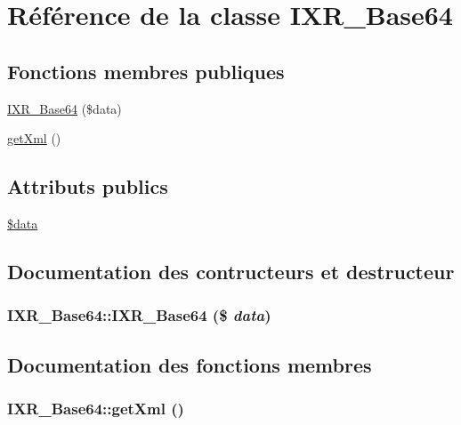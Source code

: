 \hypertarget{classIXR__Base64}{
\section{R\'{e}f\'{e}rence de la classe IXR\_\-Base64}
\label{classIXR__Base64}
}
\subsection*{Fonctions membres publiques}
\begin{CompactItemize}
\item 
\hyperlink{classIXR__Base64_a0}{IXR\_\-Base64} (\$data)
\item 
\hyperlink{classIXR__Base64_a1}{get\-Xml} ()
\end{CompactItemize}
\subsection*{Attributs publics}
\begin{CompactItemize}
\item 
\hyperlink{classIXR__Base64_o0}{\$data}
\end{CompactItemize}


\subsection{Documentation des contructeurs et destructeur}
\hypertarget{classIXR__Base64_a0}{
\subsubsection[IXR\_\-Base64]{\setlength{\rightskip}{0pt plus 5cm}IXR\_\-Base64::IXR\_\-Base64 (\$ {\em data})}}
\label{classIXR__Base64_a0}




\subsection{Documentation des fonctions membres}
\hypertarget{classIXR__Base64_a1}{
\subsubsection[getXml]{\setlength{\rightskip}{0pt plus 5cm}IXR\_\-Base64::get\-Xml ()}}
\label{classIXR__Base64_a1}




